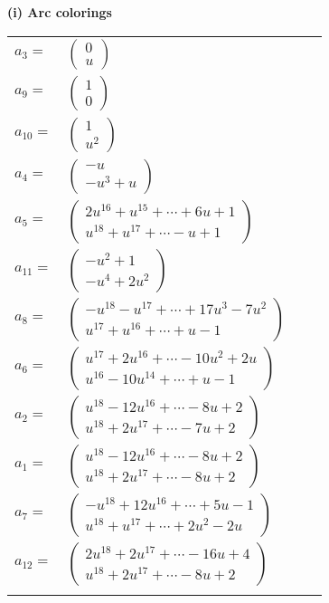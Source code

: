 \documentclass[1p]{elsarticle_modified}
\theoremstyle{definition}
\begin{document}
\flushleft \textbf{(i) Arc colorings}\\
\begin{tabular}{m{7pt} m{180pt} m{7pt} m{180pt} }
\flushright $a_{3}=$&$\begin{pmatrix}0\\u\end{pmatrix}$ \\
\flushright $a_{9}=$&$\begin{pmatrix}1\\0\end{pmatrix}$ \\
\flushright $a_{10}=$&$\begin{pmatrix}1\\u^2\end{pmatrix}$ \\
\flushright $a_{4}=$&$\begin{pmatrix}- u\\- u^3+u\end{pmatrix}$ \\
\flushright $a_{5}=$&$\begin{pmatrix}2 u^{16}+u^{15}+\cdots+6 u+1\\u^{18}+u^{17}+\cdots- u+1\end{pmatrix}$ \\
\flushright $a_{11}=$&$\begin{pmatrix}- u^2+1\\- u^4+2 u^2\end{pmatrix}$ \\
\flushright $a_{8}=$&$\begin{pmatrix}- u^{18}- u^{17}+\cdots+17 u^3-7 u^2\\u^{17}+u^{16}+\cdots+u-1\end{pmatrix}$ \\
\flushright $a_{6}=$&$\begin{pmatrix}u^{17}+2 u^{16}+\cdots-10 u^2+2 u\\u^{16}-10 u^{14}+\cdots+u-1\end{pmatrix}$ \\
\flushright $a_{2}=$&$\begin{pmatrix}u^{18}-12 u^{16}+\cdots-8 u+2\\u^{18}+2 u^{17}+\cdots-7 u+2\end{pmatrix}$ \\
\flushright $a_{1}=$&$\begin{pmatrix}u^{18}-12 u^{16}+\cdots-8 u+2\\u^{18}+2 u^{17}+\cdots-8 u+2\end{pmatrix}$ \\
\flushright $a_{7}=$&$\begin{pmatrix}- u^{18}+12 u^{16}+\cdots+5 u-1\\u^{18}+u^{17}+\cdots+2 u^2-2 u\end{pmatrix}$ \\
\flushright $a_{12}=$&$\begin{pmatrix}2 u^{18}+2 u^{17}+\cdots-16 u+4\\u^{18}+2 u^{17}+\cdots-8 u+2\end{pmatrix}$\\&\end{tabular}
\end{document}
